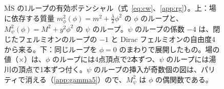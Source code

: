 \documentclass[a4paper,10pt]{ltjsarticle}
\newcommand{\MSbar}{\overline{\mathrm{MS}}}
\begin{document}
\begin{figure}[tbp]
\caption{$\MSbar$ の1ループの有効ポテンシャル（式~\eqref{eq:cw}、\ref{app:rg}）。上：場に依存する質量 $m_\phi^2(\phi)=m^2+\frac\lambda2\phi^2$ の $\phi$ のループと、$M_\psi^2(\phi)=M^2+y^2\phi^2$ の $\psi$ のループ。$\psi$ のループの係数 $-4$ は、閉じたフェルミオンのループの $-1$ と Dirac フェルミオンの自由度4から来る。下：同じループを $\phi=0$ のまわりで展開したもの。場の値（$\times$）は、$\phi$ のループには4点頂点で2本ずつ、$\psi$ のループには湯川の頂点で1本ずつ付く。$\psi$ のループの挿入が奇数個の図は、パリティで消える（\ref{app:gamma5}）ので、$M_\psi^2$ は $\phi$ の偶関数である。}
\label{fig:cw}
\end{figure}
\end{document}
